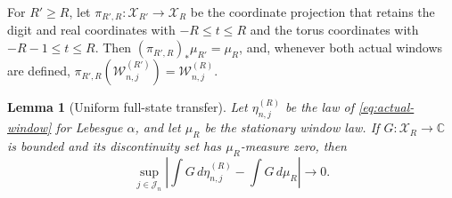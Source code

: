 \documentclass[11pt,a4paper]{amsart}
\newtheorem{lemma}[theorem]{Lemma}
\theoremstyle{definition}
\theoremstyle{remark}
\begin{document}
For $R'\ge R$, let
$\pi_{R',R}:\mathcal X_{R'}\to\mathcal X_R$ be the coordinate projection
that retains the digit and real coordinates with $-R\le t\le R$ and the
torus coordinates with $-R-1\le t\le R$.  Then
$(\pi_{R',R})_*\mu_{R'}=\mu_R$, and, whenever both actual windows are
defined,
$\pi_{R',R}(\mathcal W_{n,j}^{(R')})=\mathcal W_{n,j}^{(R)}$.

\begin{lemma}[Uniform full-state transfer]\label{lem:full-state}
Let $\eta_{n,j}^{(R)}$ be the law of \eqref{eq:actual-window} for Lebesgue
$\alpha$, and let $\mu_R$ be the stationary window law.  If
$G:\mathcal X_R\to\mathbb C$ is bounded and its discontinuity set has
$\mu_R$-measure zero, then
\begin{equation}\label{eq:full-state}
 \sup_{j\in\mathcal J_n}
 \left|\int G\,d\eta_{n,j}^{(R)}-\int G\,d\mu_R\right|\longrightarrow0.
\end{equation}
\end{lemma}
\end{document}

